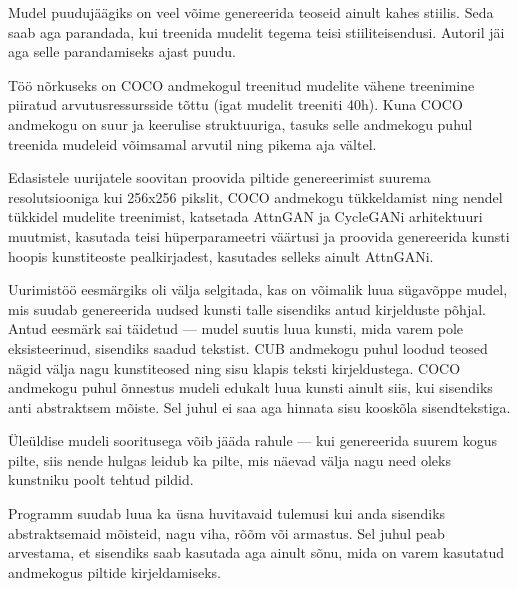 \documentclass{vilgym}
\begin{document}
	Mudel puudujäägiks on veel võime genereerida teoseid ainult kahes stiilis. Seda saab aga parandada, kui treenida mudelit tegema teisi stiiliteisendusi. Autoril jäi aga selle parandamiseks ajast puudu.

	Töö nõrkuseks on COCO andmekogul treenitud mudelite vähene treenimine piiratud arvutusressursside tõttu (igat mudelit treeniti 40h). Kuna COCO andmekogu on suur ja keerulise struktuuriga, tasuks selle andmekogu puhul treenida mudeleid võimsamal arvutil ning pikema aja vältel.

	Edasistele uurijatele soovitan proovida piltide genereerimist suurema resolutsiooniga kui 256x256 pikslit, COCO andmekogu tükkeldamist ning nendel tükkidel mudelite treenimist, katsetada AttnGAN ja CycleGANi arhitektuuri muutmist, kasutada teisi hüperparameetri väärtusi ja proovida genereerida kunsti hoopis kunstiteoste pealkirjadest, kasutades selleks ainult AttnGANi.
	
	Uurimistöö eesmärgiks oli välja selgitada, kas on võimalik luua sügavõppe mudel, mis suudab genereerida uudsed kunsti talle sisendiks antud kirjelduste põhjal. Antud eesmärk sai täidetud --- mudel suutis luua kunsti, mida varem pole eksisteerinud, sisendiks saadud tekstist. CUB andmekogu puhul loodud teosed nägid välja nagu kunstiteosed ning sisu klapis teksti kirjeldustega. COCO andmekogu puhul õnnestus mudeli edukalt luua kunsti ainult siis, kui sisendiks anti abstraktsem mõiste. Sel juhul ei saa aga hinnata sisu kooskõla sisendtekstiga.


	Üleüldise mudeli sooritusega võib jääda rahule --- kui genereerida suurem kogus pilte, siis nende hulgas leidub ka pilte, mis näevad välja nagu need oleks kunstniku poolt tehtud pildid. 

	Programm suudab luua ka üsna huvitavaid tulemusi kui anda sisendiks abstraktsemaid mõisteid, nagu viha, rõõm või armastus. Sel juhul peab arvestama, et sisendiks saab kasutada aga ainult sõnu, mida on varem kasutatud andmekogus piltide kirjeldamiseks.
	
\end{document}
